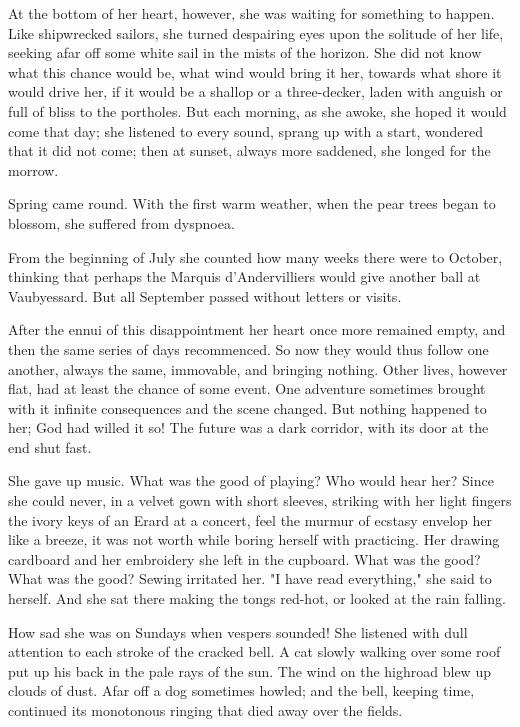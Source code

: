 \documentclass[11pt,twocolumn]{ltugboat}
\begin{document}
At the bottom of her heart, however, she was waiting for something to
happen. Like shipwrecked sailors, she turned despairing eyes upon the
solitude of her life, seeking afar off some white sail in the mists of
the horizon. She did not know what this chance would be, what wind would
bring it her, towards what shore it would drive her, if it would be a
shallop or a three-decker, laden with anguish or full of bliss to the
portholes. But each morning, as she awoke, she hoped it would come that
day; she listened to every sound, sprang up with a start, wondered that
it did not come; then at sunset, always more saddened, she longed for
the morrow.

Spring came round. With the first warm weather, when the pear trees
began to blossom, she suffered from dyspnoea.

From the beginning of July she counted how many weeks there were to
October, thinking that perhaps the Marquis d'Andervilliers would give
another ball at Vaubyessard. But all September passed without letters or
visits.

After the ennui of this disappointment her heart once more remained
empty, and then the same series of days recommenced. So now they would
thus follow one another, always the same, immovable, and bringing
nothing. Other lives, however flat, had at least the chance of some
event. One adventure sometimes brought with it infinite consequences and
the scene changed. But nothing happened to her; God had willed it so!
The future was a dark corridor, with its door at the end shut fast.

She gave up music. What was the good of playing? Who would hear her?
Since she could never, in a velvet gown with short sleeves, striking
with her light fingers the ivory keys of an Erard at a concert, feel
the murmur of ecstasy envelop her like a breeze, it was not worth while
boring herself with practicing. Her drawing cardboard and her embroidery
she left in the cupboard. What was the good? What was the good? Sewing
irritated her. "I have read everything," she said to herself. And she
sat there making the tongs red-hot, or looked at the rain falling.

How sad she was on Sundays when vespers sounded! She listened with dull
attention to each stroke of the cracked bell. A cat slowly walking over
some roof put up his back in the pale rays of the sun. The wind on the
highroad blew up clouds of dust. Afar off a dog sometimes howled; and
the bell, keeping time, continued its monotonous ringing that died away
over the fields.
\end{document}

